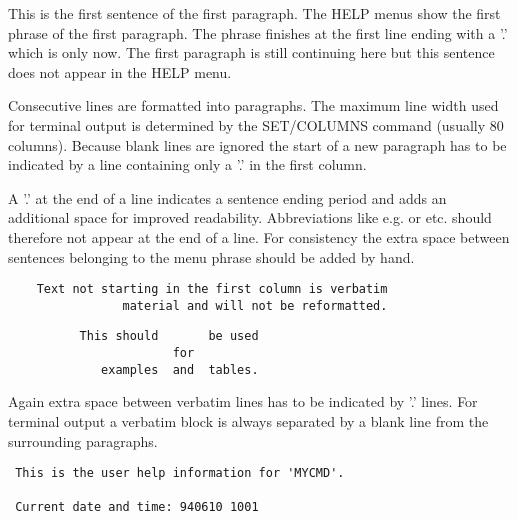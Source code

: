 

   \par
This is the first sentence of the first paragraph.  The HELP menus show the 
   first phrase of the first paragraph.  The phrase finishes at the first line 
   ending with a '.' which is only now.  The first paragraph is still 
   continuing here but this sentence does not appear in the HELP menu.  

   \par
Consecutive lines are formatted into paragraphs.  The maximum line width 
   used for terminal output is determined by the SET/COLUMNS command (usually 
   80 columns).  Because blank lines are ignored the start of a new paragraph 
   has to be indicated by a line containing only a '.' in the first column.  

   \par
A '.' at the end of a line indicates a sentence ending period and adds an 
   additional space for improved readability.  Abbreviations like e.g. or etc. 
   should therefore not appear at the end of a line.  For consistency the 
   extra space between sentences belonging to the menu phrase should be added 
   by hand.  
\begin{verbatim}
    Text not starting in the first column is verbatim
                material and will not be reformatted.
\end{verbatim}
\begin{verbatim}
          This should       be used
                       for
             examples  and  tables.
\end{verbatim}
   \par
Again extra space between verbatim lines has to be indicated by '.' lines.  
   For terminal output a verbatim block is always separated by a blank line 
   from the surrounding paragraphs.  

\begin{verbatim}
 This is the user help information for 'MYCMD'.

 Current date and time: 940610 1001
\end{verbatim}
\ENDCMD
